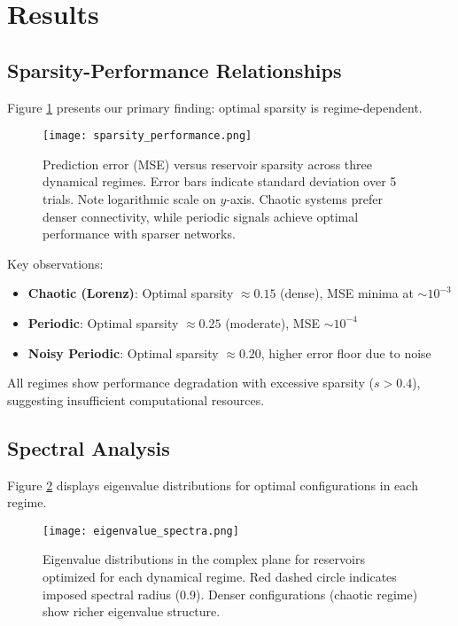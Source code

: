 \documentclass[11pt,a4paper]{article}
\begin{document}
\section{Results}

\subsection{Sparsity-Performance Relationships}

Figure \ref{fig:sparsity} presents our primary finding: optimal sparsity is regime-dependent. 

\begin{figure}[h]
    \centering
    \texttt{[image: sparsity\_performance.png]}
    \caption{Prediction error (MSE) versus reservoir sparsity across three dynamical regimes. Error bars indicate standard deviation over 5 trials. Note logarithmic scale on $y$-axis. Chaotic systems prefer denser connectivity, while periodic signals achieve optimal performance with sparser networks.}
    \label{fig:sparsity}
\end{figure}

Key observations:

\begin{itemize}
    \item \textbf{Chaotic (Lorenz)}: Optimal sparsity $\approx 0.15$ (dense), MSE minima at $\sim 10^{-3}$
    \item \textbf{Periodic}: Optimal sparsity $\approx 0.25$ (moderate), MSE $\sim 10^{-4}$
    \item \textbf{Noisy Periodic}: Optimal sparsity $\approx 0.20$, higher error floor due to noise
\end{itemize}

All regimes show performance degradation with excessive sparsity ($s > 0.4$), suggesting insufficient computational resources.

\subsection{Spectral Analysis}

Figure \ref{fig:spectra} displays eigenvalue distributions for optimal configurations in each regime.

\begin{figure}[h]
    \centering
    \texttt{[image: eigenvalue\_spectra.png]}
    \caption{Eigenvalue distributions in the complex plane for reservoirs optimized for each dynamical regime. Red dashed circle indicates imposed spectral radius (0.9). Denser configurations (chaotic regime) show richer eigenvalue structure.}
    \label{fig:spectra}
\end{figure}
\end{document}
